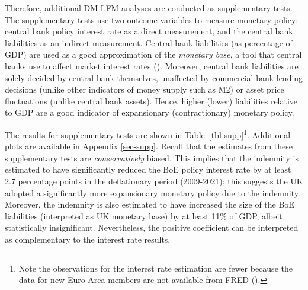 \documentclass[
  a4paper,
  abstract=true]{scrartcl}
\theoremstyle{definition}
\begin{document}
Therefore, additional DM-LFM analyses are conducted as supplementary
tests. The supplementary tests use two outcome variables to measure
monetary policy: central bank policy interest rate as a direct
measurement, and the central bank liabilities as an indirect
measurement. Central bank liabilities (as percentage of GDP) are used as
a good approximation of the \emph{monetary base}, a tool that central
banks use to affect market interest rates (). Moreover, central bank liabilities are solely decided by central
bank themselves, unaffected by commercial bank lending decisions (unlike
other indicators of money supply such as M2) or asset price fluctuations
(unlike central bank assets). Hence, higher (lower) liabilities relative
to GDP are a good indicator of expansionary (contractionary) monetary
policy.

The results for supplementary tests are shown in
Table~\ref{tbl-supp}\footnote{Note the observations for the interest
  rate estimation are fewer because the data for new Euro Area members
  are not available from FRED ().}.
Additional plots are available in Appendix \ref{sec-supp}. Recall that
the estimates from these supplementary tests are \emph{conservatively}
biased. This implies that the indemnity is estimated to have
significantly reduced the BoE policy interest rate by at least 2.7
percentage points in the deflationary period (2009-2021); this suggests
the UK adopted a significantly more expansionary monetary policy due to
the indemnity. Moreover, the indemnity is also estimated to have
increased the size of the BoE liabilities (interpreted as UK monetary
base) by at least 11\% of GDP, albeit statistically insignificant.
Nevertheless, the positive coefficient can be interpreted as
complementary to the interest rate results.
\end{document}
